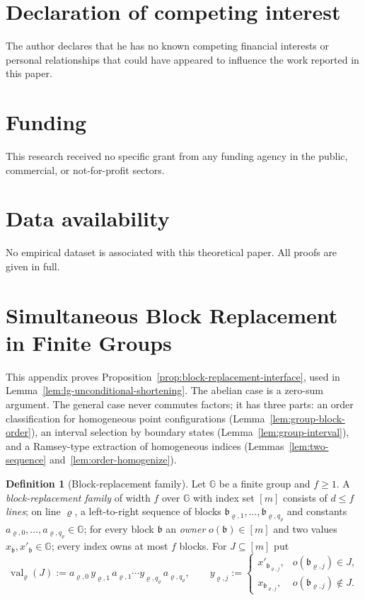\documentclass[11pt]{article}
\numberwithin{equation}{section}
\theoremstyle{plain}
\theoremstyle{definition}
\newtheorem{definition}[theorem]{Definition}
\theoremstyle{remark}
\theoremstyle{plain}
\begin{document}
\section*{Declaration of competing interest}
The author declares that he has no known competing financial interests or
personal relationships that could have appeared to influence the work reported
in this paper.

\section*{Funding}
This research received no specific grant from any funding agency in the public,
commercial, or not-for-profit sectors.

\section*{Data availability}
No empirical dataset is associated with this theoretical paper.  All proofs
are given in full.

\appendix
\section{Simultaneous Block Replacement in Finite Groups}
\label{app:group-blocks}

This appendix proves Proposition~\ref{prop:block-replacement-interface}, used in
Lemma~\ref{lem:lg-unconditional-shortening}.
The abelian case is a zero-sum argument.  The general case never commutes
factors; it has three parts: an order classification for homogeneous point
configurations (Lemma~\ref{lem:group-block-order}), an interval selection by
boundary states (Lemma~\ref{lem:group-interval}), and a Ramsey-type extraction of
homogeneous indices (Lemmas~\ref{lem:two-sequence} and~\ref{lem:order-homogenize}).

\begin{definition}[Block-replacement family]
\label{def:block-family}
Let ${\mathbb G}$ be a finite group and $f\ge1$.  A \emph{block-replacement family} of
width $f$ over ${\mathbb G}$ with index set $[m]$ consists of $d\le f$ \emph{lines}; on
line $\varrho$, a left-to-right sequence of blocks $\mathfrak b_{\varrho,1},\ldots,\mathfrak b_{\varrho,q_\varrho}$
and constants $a_{\varrho,0},\ldots,a_{\varrho,q_\varrho}\in {\mathbb G}$; for every block $\mathfrak b$ an
\emph{owner} $o(\mathfrak b)\in[m]$ and two values $x_{\mathfrak b},x'_{\mathfrak b}\in {\mathbb G}$; every
index owns at most $f$ blocks.  For $J\subseteq[m]$ put
\[
 \operatorname{val}_\varrho(J):=a_{\varrho,0}\,y_{\varrho,1}\,a_{\varrho,1}\cdots y_{\varrho,q_\varrho}\,a_{\varrho,q_\varrho},
 \qquad
 y_{\varrho,j}:=
 \begin{cases}
 x'_{\mathfrak b_{\varrho,j}},& o(\mathfrak b_{\varrho,j})\in J,\\
 x_{\mathfrak b_{\varrho,j}},& o(\mathfrak b_{\varrho,j})\notin J.
 \end{cases}
\]
\end{definition}
\end{document}
